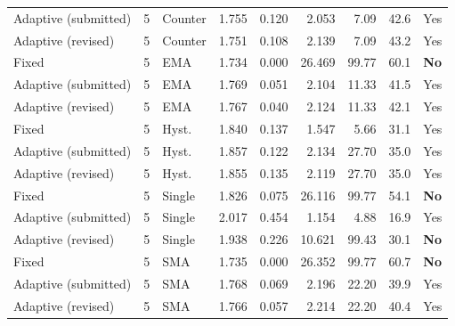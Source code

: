 {\begin{longtable}{lllrrrrrl}
Adaptive (submitted) & 5 & Counter & 1.755 & 0.120 & 2.053 & 7.09 & 42.6 & Yes\\
Adaptive (revised) & 5 & Counter & 1.751 & 0.108 & 2.139 & 7.09 & 43.2 & Yes\\
Fixed & 5 & EMA & 1.734 & 0.000 & 26.469 & 99.77 & 60.1 & \textbf{No}\\
Adaptive (submitted) & 5 & EMA & 1.769 & 0.051 & 2.104 & 11.33 & 41.5 & Yes\\
Adaptive (revised) & 5 & EMA & 1.767 & 0.040 & 2.124 & 11.33 & 42.1 & Yes\\
Fixed & 5 & Hyst. & 1.840 & 0.137 & 1.547 & 5.66 & 31.1 & Yes\\
Adaptive (submitted) & 5 & Hyst. & 1.857 & 0.122 & 2.134 & 27.70 & 35.0 & Yes\\
Adaptive (revised) & 5 & Hyst. & 1.855 & 0.135 & 2.119 & 27.70 & 35.0 & Yes\\
Fixed & 5 & Single & 1.826 & 0.075 & 26.116 & 99.77 & 54.1 & \textbf{No}\\
Adaptive (submitted) & 5 & Single & 2.017 & 0.454 & 1.154 & 4.88 & 16.9 & Yes\\
Adaptive (revised) & 5 & Single & 1.938 & 0.226 & 10.621 & 99.43 & 30.1 & \textbf{No}\\
Fixed & 5 & SMA & 1.735 & 0.000 & 26.352 & 99.77 & 60.7 & \textbf{No}\\
Adaptive (submitted) & 5 & SMA & 1.768 & 0.069 & 2.196 & 22.20 & 39.9 & Yes\\
Adaptive (revised) & 5 & SMA & 1.766 & 0.057 & 2.214 & 22.20 & 40.4 & Yes\\
\end{longtable}}
\par\medskip
